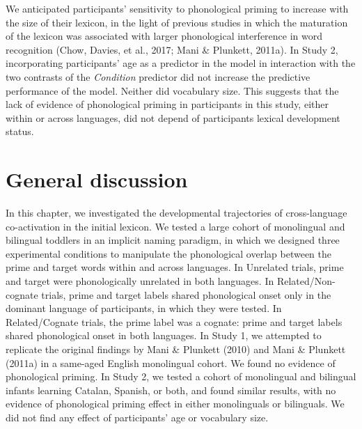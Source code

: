 \documentclass[
  12pt,
  b5paperpaper,
  twoside]{scrreprt}
\begin{document}
We anticipated participants' sensitivity to phonological priming to
increase with the size of their lexicon, in the light of previous
studies in which the maturation of the lexicon was associated with
larger phonological interference in word recognition (Chow, Davies, et
al., 2017; Mani \& Plunkett, 2011a). In Study 2, incorporating
participants' age as a predictor in the model in interaction with the
two contrasts of the \emph{Condition} predictor did not increase the
predictive performance of the model. Neither did vocabulary size. This
suggests that the lack of evidence of phonological priming in
participants in this study, either within or across languages, did not
depend of participants lexical development status.

\hypertarget{general-discussion}{%
\section{General discussion}\label{general-discussion}}

In this chapter, we investigated the developmental trajectories of
cross-language co-activation in the initial lexicon. We tested a large
cohort of monolingual and bilingual toddlers in an implicit naming
paradigm, in which we designed three experimental conditions to
manipulate the phonological overlap between the prime and target words
within and across languages. In Unrelated trials, prime and target were
phonologically unrelated in both languages. In Related/Non-cognate
trials, prime and target labels shared phonological onset only in the
dominant language of participants, in which they were tested. In
Related/Cognate trials, the prime label was a cognate: prime and target
labels shared phonological onset in both languages. In Study 1, we
attempted to replicate the original findings by Mani \& Plunkett (2010)
and Mani \& Plunkett (2011a) in a same-aged English monolingual cohort.
We found no evidence of phonological priming. In Study 2, we tested a
cohort of monolingual and bilingual infants learning Catalan, Spanish,
or both, and found similar results, with no evidence of phonological
priming effect in either monolinguals or bilinguals. We did not find any
effect of participants' age or vocabulary size.
\end{document}
